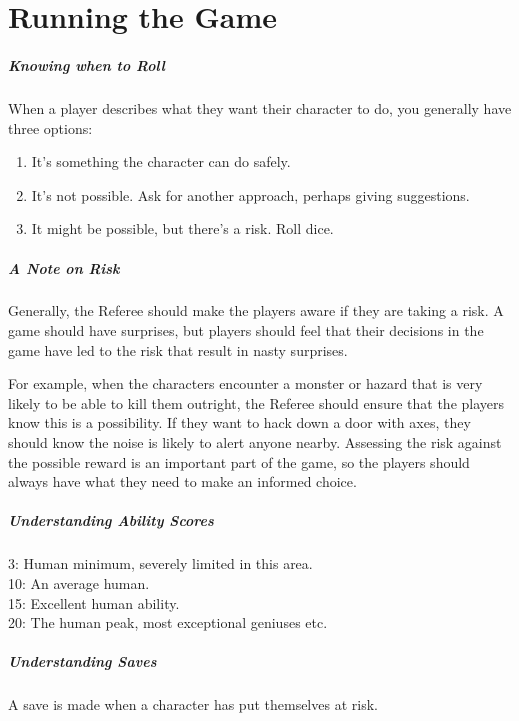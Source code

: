 \documentclass[itdr]{subfiles}
\begin{document}
\chapter{Running the Game}

\paragraph{Knowing when to Roll}
When a player describes what they want their character to do, you generally
have three options:
\begin{enumerate}
	\item It's something the character can do safely.
	\item It's not possible. Ask for another approach, \mbox{perhaps} giving suggestions.
	\item It might be possible, but there's a risk. Roll dice.
\end{enumerate}

\paragraph{A Note on Risk}
Generally, the Referee should make the players aware if they are taking a risk. A game should have surprises, but players should feel that their decisions in the game have led to the risk that result in nasty surprises.

For example, when the characters encounter a monster or hazard that is very likely to be able to kill them outright, the Referee should ensure that the players know this is a possibility. If they want to hack down a door with axes, they should know the noise is likely to alert anyone nearby. Assessing the risk against the possible reward is an important part of the game, so the players should always have what they need to make an informed choice.

\paragraph{Understanding Ability Scores}
3: Human minimum, severely limited in this area.\\
10: An average human.\\
15: Excellent human ability.\\
20: The human peak, most exceptional geniuses etc.

\paragraph{Understanding Saves}
A save is made  when a character has put themselves at risk.
\end{document}
